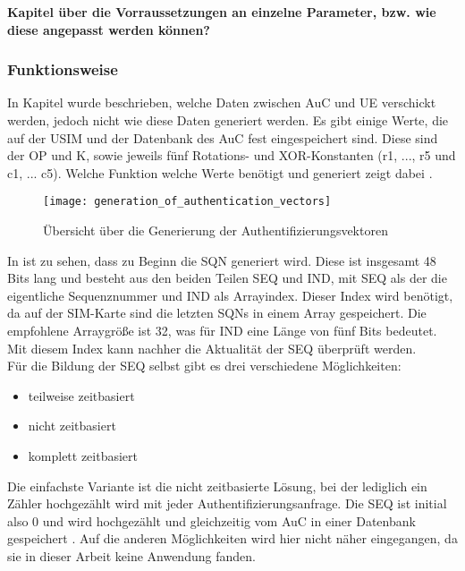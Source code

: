  \textbf{Kapitel über die Vorraussetzungen an einzelne Parameter, bzw. wie diese angepasst
 werden können?}

 \subsubsection{Funktionsweise}
 \label{milenage-funktion}
 In Kapitel  wurde beschrieben, welche Daten zwischen
 \ac{AuC} und \ac{UE} verschickt werden, jedoch nicht wie diese Daten generiert werden. Es
 gibt einige Werte, die auf der \ac{USIM} und der Datenbank des \ac{AuC} fest eingespeichert
 sind. Diese sind der \ac{OP} und \ac{K}, sowie jeweils fünf Rotations- und XOR-Konstanten
 (r1, ..., r5 und c1, ... c5). Welche Funktion welche Werte benötigt und generiert zeigt dabei .
 
 \begin{figure}[htp]
  \begin{center}
   \texttt{[image: generation\_of\_authentication\_vectors]}
  \end{center}
  \caption[Übersicht über die Generierung der Authentifizierungsvektoren]{Übersicht über die Generierung der Authentifizierungsvektoren \cite{3gpp.33.102}}
  \label{fig:funktionsubersicht}
 \end{figure}
 
 In  ist zu sehen, dass zu Beginn die \ac{SQN} generiert wird.
 Diese ist insgesamt 48 Bits lang und besteht aus den beiden Teilen SEQ und IND, mit SEQ als
 der die eigentliche Sequenznummer und IND als Arrayindex. Dieser Index wird benötigt, da auf
 der SIM-Karte sind die letzten SQNs in einem Array gespeichert. Die empfohlene Arraygröße ist
 32, was für IND eine Länge von fünf Bits bedeutet. Mit diesem Index kann nachher die
 Aktualität der SEQ überprüft werden.\cite{3gpp.33.102} \\
 Für die Bildung der SEQ selbst gibt es drei verschiedene Möglichkeiten:
 \begin{itemize}
  \item teilweise zeitbasiert
  \item nicht zeitbasiert
  \item komplett zeitbasiert
 \end{itemize}
 
 Die einfachste Variante ist die nicht zeitbasierte Lösung, bei der lediglich ein Zähler hochgezählt
 wird mit jeder Authentifizierungsanfrage. Die SEQ ist initial also 0 und wird hochgezählt und
 gleichzeitig vom \ac{AuC} in einer Datenbank gespeichert \cite{3gpp.33.102}. Auf die anderen
 Möglichkeiten wird hier nicht näher eingegangen, da sie in dieser Arbeit keine Anwendung
 fanden.
 
